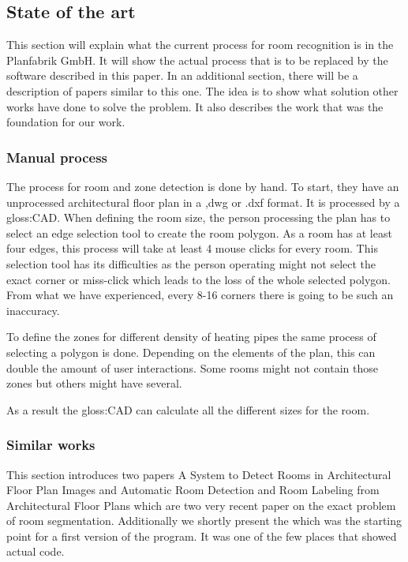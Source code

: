 \subsection{State of the art}
This section will explain what the current process for room recognition is in the Planfabrik GmbH. It will show the actual process that is to be replaced by the software described in this paper. In an additional section, there will be a description of papers similar to this one. The idea is to show what solution other works have done to solve the problem. It also describes the work that was the foundation for our work.

\subsubsection{Manual process}
 The process for room and zone detection is done by hand. To start, they have an unprocessed architectural floor plan in a ,dwg or .dxf format. It is processed by a \gls{gloss:CAD}. When defining the room size, the person processing the plan has to select an edge selection tool to create the room polygon. As a room has at least four edges, this process will take at least 4 mouse clicks for every room. This selection tool has its difficulties as the person operating might not select the exact corner or miss-click which leads to the loss of the whole selected polygon. From what we have experienced, every 8-16 corners there is going to be such an inaccuracy. 
 
 To define the zones for different density of heating pipes the same process of selecting a polygon is done. Depending on the elements of the plan, this can double the amount of user interactions. Some rooms might not contain those zones but others might have several.
 
 As a result the \gls{gloss:CAD} can calculate all the different sizes for the room.
 
\subsubsection{Similar works}
This section introduces two papers A System to Detect Rooms in Architectural Floor Plan Images \citep{mace_valveny_loctea_tabbone_2010} and Automatic Room Detection and Room Labeling from Architectural Floor Plans \citep[1]{ahmed_liwicki_weber_dengel_2012} which are two very recent paper on the exact problem of room segmentation. Additionally we shortly present the \citep[1]{nikieroomdet} which was the starting point for a first version of the program. It was one of the few places that showed actual code. 

